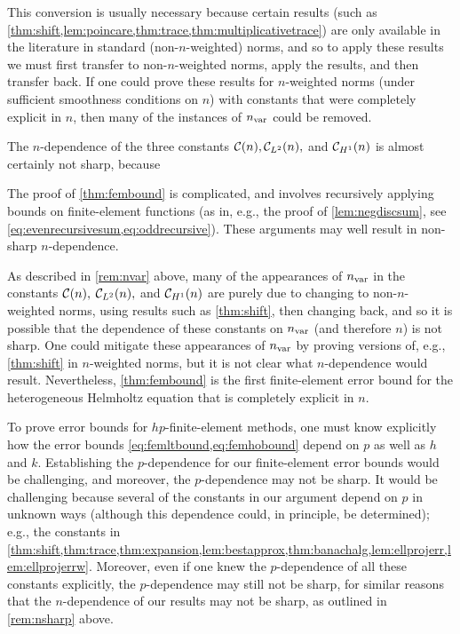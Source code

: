 This conversion is usually necessary because certain results (such as \cref{thm:shift,lem:poincare,thm:trace,thm:multiplicativetrace}) are only available in the literature in standard (non-$n$-weighted) norms, and so to apply these results we must first transfer to non-$n$-weighted norms, apply the results, and then transfer back. If one could prove these results for $n$-weighted norms (under sufficient smoothness conditions on $n$) with constants that were completely explicit in $n$, then many of the instances of $n_{\mathrm{var}}$ could be removed.
\ere

\label{rem:nsharp}
The $n$-dependence of the three constants $\mathcal C(n), \mathcal C_{L^{2}}(n),$ and $\mathcal C_{H^{1}}(n)$ is almost certainly not sharp, because
\ben
\item The proof of \cref{thm:fembound} is complicated, and involves recursively applying bounds on finite-element functions (as in, e.g., the proof of \cref{lem:negdiscsum}, see \cref{eq:evenrecursivesum,eq:oddrecursive}). These arguments may well result in non-sharp $n$-dependence.
  \item As described in \cref{rem:nvar} above, many of the appearances of $n_{\mathrm{var}}$ in the constants $\mathcal C(n),$ $\mathcal C_{L^{2}}(n),$ and $\mathcal C_{H^{1}}(n)$ are purely due to changing to non-$n$-weighted norms, using results such as \cref{thm:shift}, then changing back, and so it is possible that the dependence of these constants on $n_{\mathrm{var}}$ (and therefore $n$) is not sharp. One could mitigate these appearances of $n_{\mathrm{var}}$ by proving versions of, e.g., \cref{thm:shift} in $n$-weighted norms, but it is not clear what $n$-dependence would result.
    \een
Nevertheless, \cref{thm:fembound} is the first finite-element error bound for the heterogeneous Helmholtz equation that is completely explicit in $n.$
\ere

\bre[$p$-dependence]
To prove error bounds for $hp$-finite-element methods, one must know explicitly how the error bounds \cref{eq:femltbound,eq:femhobound} depend on $p$ as well as $h$ and $k$. 
Establishing the $p$-dependence for our finite-element error bounds would be challenging, and moreover, the $p$-dependence may not be sharp. It would be challenging because several of the constants in our argument depend on $p$ in unknown ways (although this dependence could, in principle, be determined); e.g., the constants in \cref{thm:shift,thm:trace,thm:expansion,lem:bestapprox,thm:banachalg,lem:ellprojerr,lem:ellprojerrw}. Moreover, even if one knew the $p$-dependence of all these constants explicitly, the $p$-dependence may still not be sharp, for similar reasons that the $n$-dependence of our results may not be sharp, as outlined in \cref{rem:nsharp} above.
\ere

